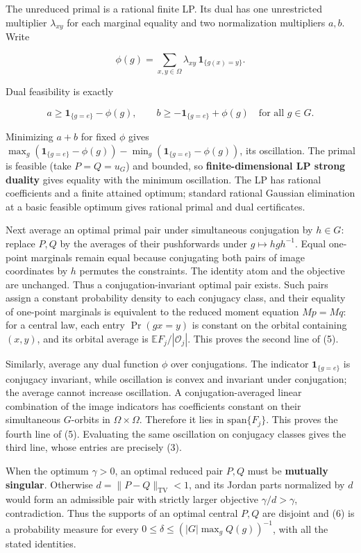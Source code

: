 \documentclass[11pt]{article}
\begin{document}
The unreduced primal is a rational finite LP. Its dual has one
unrestricted multiplier \(\lambda_{xy}\) for each marginal equality and
two normalization multipliers \(a,b\). Write

\[
\phi(g)=\sum_{x,y\in\Omega}\lambda_{xy}\,\mathbf1_{\{g(x)=y\}}.
\]

Dual feasibility is exactly

\[
a\ge\mathbf1_{\{g=e\}}-\phi(g),\qquad
b\ge-\mathbf1_{\{g=e\}}+\phi(g)
\quad\text{for all }g\in G.
\]

Minimizing \(a+b\) for fixed \(\phi\) gives
\(\max_g(\mathbf1_{\{g=e\}}-\phi(g))-
\min_g(\mathbf1_{\{g=e\}}-\phi(g))\), its oscillation. The primal is
feasible (take \(P=Q=u_G\)) and bounded, so \textbf{finite-dimensional
LP strong duality} gives equality with the minimum oscillation. The LP
has rational coefficients and a finite attained optimum; standard
rational Gaussian elimination at a basic feasible optimum gives rational
primal and dual certificates.

Next average an optimal primal pair under simultaneous conjugation by
\(h\in G\): replace \(P,Q\) by the averages of their pushforwards under
\(g\mapsto hgh^{-1}\). Equal one-point marginals remain equal because
conjugating both pairs of image coordinates by \(h\) permutes the
constraints. The identity atom and the objective are unchanged. Thus a
conjugation-invariant optimal pair exists. Such pairs assign a constant
probability density to each conjugacy class, and their equality of
one-point marginals is equivalent to the reduced moment equation
\(Mp=Mq\): for a central law, each entry \(\Pr(gx=y)\) is constant on
the orbital containing \((x,y)\), and its orbital average is
\(\mathbb EF_j/|\mathcal O_j|\). This proves the second line of (5).

Similarly, average any dual function \(\phi\) over conjugations. The
indicator \(\mathbf1_{\{g=e\}}\) is conjugacy invariant, while
oscillation is convex and invariant under conjugation; the average
cannot increase oscillation. A conjugation-averaged linear combination
of the image indicators has coefficients constant on their simultaneous
\(G\)-orbits in \(\Omega\times\Omega\). Therefore it lies in
\(\mathrm{span}\{F_j\}\). This proves the fourth line of (5). Evaluating
the same oscillation on conjugacy classes gives the third line, whose
entries are precisely (3).

When the optimum \(\gamma>0\), an optimal reduced pair \(P,Q\) must be
\textbf{mutually singular}. Otherwise \(d=\|P-Q\|_{\mathrm{TV}}<1\), and
its Jordan parts normalized by \(d\) would form an admissible pair with
strictly larger objective \(\gamma/d>\gamma\), contradiction. Thus the
supports of an optimal central \(P,Q\) are disjoint and (6) is a
probability measure for every \(0\le\delta\le(|G|\max_gQ(g))^{-1}\),
with all the stated identities.
\end{document}

